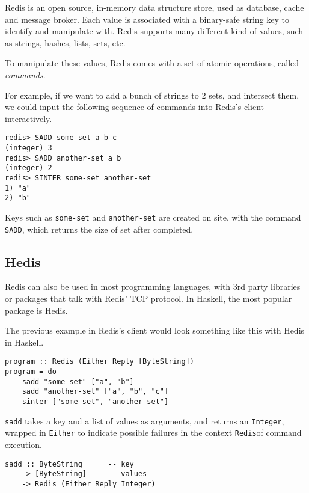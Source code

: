 \documentclass[pldi]{sigplanconf-pldi16}
\begin{document}
Redis is an open source, in-memory data structure store, used as
 database, cache and message broker. Each value is associated with a binary-safe
 string key to identify and manipulate with. Redis supports many different
 kind of values, such as strings, hashes, lists, sets, etc.

To manipulate these values, Redis comes with a set of atomic operations, called
 \emph{commands}.

For example, if we want to add a bunch of strings to 2 sets, and intersect them,
 we could input the following sequence of commands into Redis's client
 interactively.

\begin{verbatim}
redis> SADD some-set a b c
(integer) 3
redis> SADD another-set a b
(integer) 2
redis> SINTER some-set another-set
1) "a"
2) "b"
\end{verbatim}

Keys such as \texttt{some-set} and \texttt{another-set}
 are created on site, with the command \texttt{SADD}, which returns
 the size of set after completed.

\subsection{Hedis}
Redis can also be used in most programming languages, with 3rd party libraries
 or packages that talk with Redis' TCP protocol. In Haskell, the most popular
 package is Hedis.

The previous example in Redis's client would look something like this with
 Hedis in Haskell.

\begin{verbatim}
program :: Redis (Either Reply [ByteString])
program = do
    sadd "some-set" ["a", "b"]
    sadd "another-set" ["a", "b", "c"]
    sinter ["some-set", "another-set"]
\end{verbatim}

\texttt{sadd} takes a key and a list of values as arguments, and
 returns an \texttt{Integer}, wrapped in
 \texttt{Either} to indicate possible failures in the context
 \texttt{Redis}\footnotemark of command execution.

\begin{verbatim}
sadd :: ByteString      -- key
    -> [ByteString]     -- values
    -> Redis (Either Reply Integer)
\end{verbatim}
\end{document}

